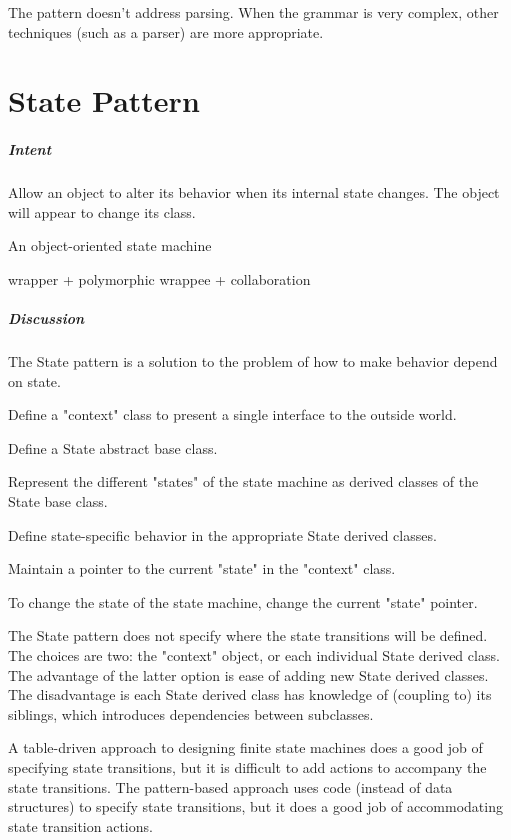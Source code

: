 \documentclass{book}
\begin{document}
The pattern doesn't address parsing. When the grammar is very complex, other techniques (such as a parser) are more appropriate.

\chapter{State Pattern}\label{StatePattern}
\paragraph{Intent}
    Allow an object to alter its behavior when its internal state changes. The object will appear to change its class.

    An object-oriented state machine

    wrapper + polymorphic wrappee + collaboration
\paragraph{Discussion}

The State pattern is a solution to the problem of how to make behavior depend on state.

    Define a "context" class to present a single interface to the outside world.

    Define a State abstract base class.

    Represent the different "states" of the state machine as derived classes of the State base class.

    Define state-specific behavior in the appropriate State derived classes.

    Maintain a pointer to the current "state" in the "context" class.

    To change the state of the state machine, change the current "state" pointer.

The State pattern does not specify where the state transitions will be defined.
The choices are two: the "context" object, or each individual State derived class.
The advantage of the latter option is ease of adding new State derived classes.
The disadvantage is each State derived class has knowledge of (coupling to) its siblings, which introduces dependencies between subclasses.

A table-driven approach to designing finite state machines does a good job of specifying state transitions, but it is difficult to add actions to accompany the state transitions.
The pattern-based approach uses code (instead of data structures) to specify state transitions, but it does a good job of accommodating state transition actions.
\end{document}
